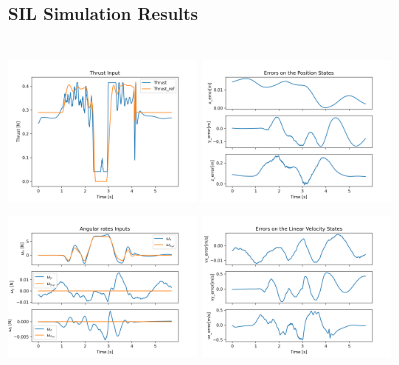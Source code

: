 \documentclass{thesisbeamer}
\begin{document}
\begin{frame}
	\frametitle{SIL Simulation Results}

	\begin{columns}[t]
		\centering
			\includegraphics[width=5cm,height=4cm]{Images/sil_simulations/thrustInput.png}
			\includegraphics[width=5cm,height=4cm]{Images/sil_simulations/Errors_position.png}
			\centering
			\includegraphics[width=5cm,height=4cm]{Images/sil_simulations/angulareRatesInputs.png}
			\includegraphics[width=5cm,height=4cm]{Images/sil_simulations/Errors_velocities.png}
	\end{columns}	
	
\end{frame}
\end{document}
